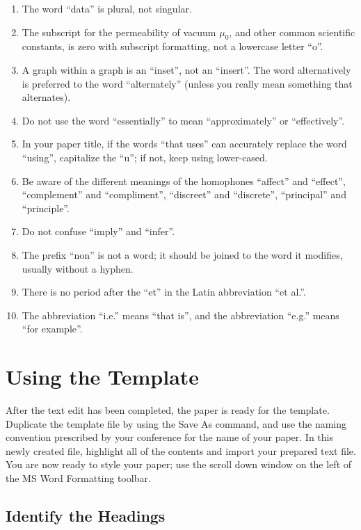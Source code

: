 \documentclass{article} %
\begin{document}
\begin{multicols}{2}
\begin{enumerate}
\item \textit{ }The word ``data'' is plural, not singular.
\item  The subscript for the permeability of vacuum ${\mu}_{0}$, and other common scientific constants, is zero with subscript formatting, not a lowercase letter ``o''.
\item  A graph within a graph is an ``inset'', not an ``insert''. The word alternatively is preferred to the word ``alternately'' (unless you really mean something that alternates).
\item  Do not use the word ``essentially'' to mean ``approximately'' or ``effectively''.
\item  In your paper title, if the words ``that uses'' can accurately replace the word ``using'', capitalize the ``u''; if not, keep using lower-cased.
\item  Be aware of the different meanings of the homophones ``affect'' and ``effect'', ``complement'' and ``compliment'', ``discreet'' and ``discrete'', ``principal'' and ``principle''.
\item  Do not confuse ``imply'' and ``infer''.
\item  The prefix ``non'' is not a word; it should be joined to the word it modifies, usually without a hyphen.
\item  There is no period after the ``et'' in the Latin abbreviation ``et al.''.
\item  The abbreviation ``i.e.'' means ``that is'', and the abbreviation ``e.g.'' means ``for example''.
\end{enumerate}


\section{ Using the Template}

After the text edit has been completed, the paper is ready for the template. Duplicate the template file by using the Save As command, and use the naming convention prescribed by your conference for the name of your paper. In this newly created file, highlight all of the contents and import your prepared text file. You are now ready to style your paper; use the scroll down window on the left of the MS Word Formatting toolbar.


\subsection{ Identify the Headings}


\end{multicols}
\end{document}
